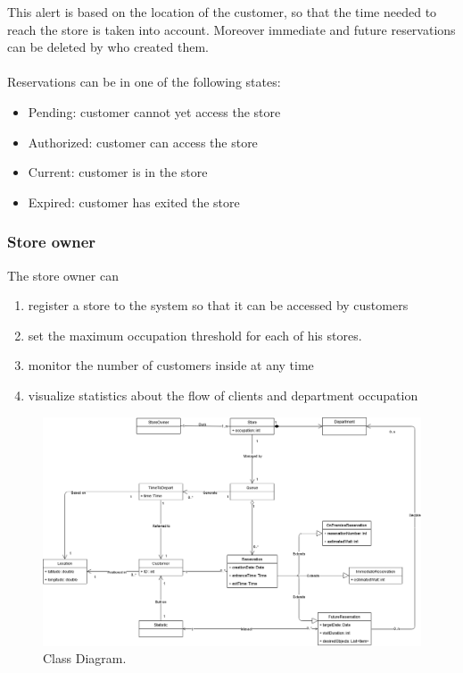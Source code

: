 This alert is based on the location of the customer, so that the time needed to reach the store is taken into account. Moreover immediate and future reservations can be deleted by who created them.\\\\
Reservations can be in one of the following states:
\begin{itemize}
	\item Pending: customer cannot yet access the store
	\item Authorized: customer can access the store
	\item Current: customer is in the store
	\item Expired: customer has exited the store
\end{itemize} 
\subsubsection{Store owner}
The store owner can
\begin{enumerate}
	\item register a store to the system so that it can be accessed by customers
	\item set the maximum occupation threshold for each of his stores.
	\item monitor the number of customers inside at any time
	\item visualize statistics about the flow of clients and department occupation
\end{enumerate}
\begin{figure}[!htb]
\centering
\includegraphics[width=\textwidth]{Images/ClassDiagram.png}
\caption{\label{fig:metamodel2}Class Diagram.}
\end{figure}
\newpage
